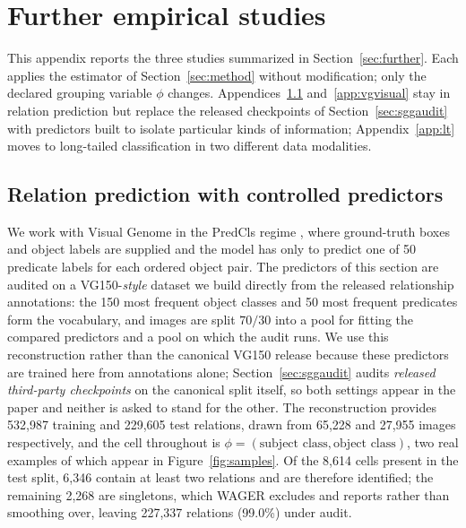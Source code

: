 \section{Further empirical studies}\label{app:studies}

This appendix reports the three studies summarized in Section~\ref{sec:further}. Each
applies the estimator of Section~\ref{sec:method} without modification; only the declared
grouping variable $\phi$ changes. Appendices~\ref{app:vgmain} and~\ref{app:vgvisual} stay
in relation prediction but replace the released checkpoints of
Section~\ref{sec:sggaudit} with predictors built to isolate particular kinds of
information; Appendix~\ref{app:lt} moves to long-tailed classification in two different
data modalities.

\subsection{Relation prediction with controlled predictors}\label{app:vgmain}\label{sec:data}

We work with Visual Genome \cite{krishna2017visual} in the PredCls regime
\cite{xu2017scene}, where ground-truth boxes and object labels are supplied and
the model has only to predict one of 50 predicate labels for each ordered object pair.
The predictors of this section are audited on a VG150-\emph{style} dataset we build
directly from the released relationship annotations: the 150 most frequent object
classes and 50 most frequent predicates form the vocabulary, and images are split
$70/30$ into a pool for fitting the compared predictors and a pool on which the audit
runs. We use this reconstruction rather than the canonical VG150 release because these
predictors are trained here from annotations alone; Section~\ref{sec:sggaudit} audits
\emph{released third-party checkpoints} on the canonical split itself, so both settings
appear in the paper and neither is asked to stand for the other. The reconstruction
provides 532,987 training and 229,605 test relations, drawn from 65,228 and 27,955
images respectively, and the cell throughout is
$\phi=(\text{subject class},\text{object class})$, two real examples of which appear in
Figure~\ref{fig:samples}. Of the 8,614 cells present in the test split, 6,346 contain at
least two relations and are therefore identified; the remaining 2,268 are singletons,
which WAGER excludes and reports rather than smoothing over, leaving 227,337 relations
(99.0\%) under audit.

